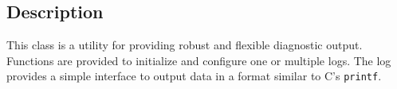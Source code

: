 \subsection{Description}

This class is a utility for providing robust and flexible diagnostic output.
Functions are provided to initialize and configure one or multiple logs.
The log provides a simple interface to output data in a format similar to 
C's {\tt printf}.





